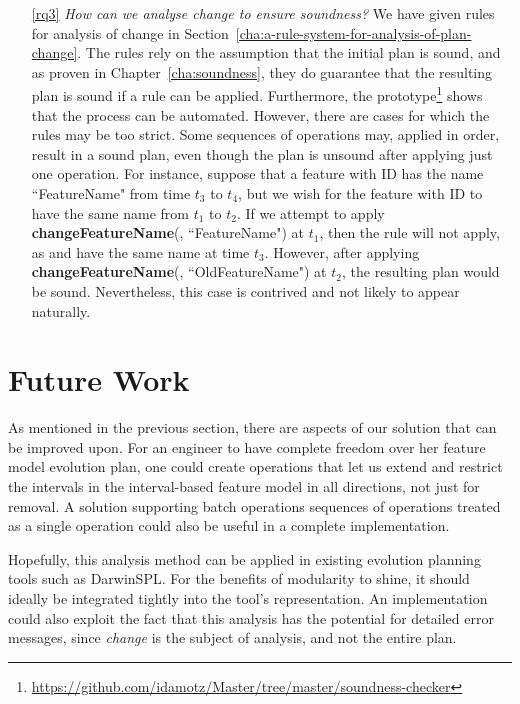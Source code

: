 \begin{enumerate}
   \item[\ref{rq3}] \textit{How can we analyse change to ensure soundness?} 
      We have given rules for analysis of change in Section~\vref{cha:a-rule-system-for-analysis-of-plan-change}. The rules rely on the assumption that the initial plan is sound, and as proven in Chapter~\vref{cha:soundness}, they do guarantee that the resulting plan is sound if a rule can be applied. Furthermore, the prototype\footnote{\url{https://github.com/idamotz/Master/tree/master/soundness-checker}} shows that the process can be automated. However, there are cases for which the rules may be too strict. Some sequences of operations may, applied in order, result in a sound plan, even though the plan is unsound after applying just one operation. For instance, suppose that a feature with ID  has the name ``FeatureName" from time $t_3$ to $t_4$, but we wish for the feature with ID  to have the same name from $t_1$ to $t_2$. If we attempt to apply \textbf{changeFeatureName}(, ``FeatureName") at $t_1$, then the  rule will not apply, as  and  have the same name at time $t_3$. However, after applying \textbf{changeFeatureName}(, ``OldFeatureName") at $t_2$, the resulting plan would be sound.
      Nevertheless, this case is contrived and not likely to appear naturally. 
      
\end{enumerate}

\section{Future Work}

As mentioned in the previous section, there are aspects of our solution that can be improved upon. For an engineer to have complete freedom over her feature model evolution plan, one could create operations that let us extend and restrict the intervals in the interval-based feature model in all directions, not just for removal. A solution supporting batch operations \textemdash{} sequences of operations treated as a single operation \textemdash{} could also be useful in a complete implementation. 

Hopefully, this analysis method can be applied in existing evolution planning tools such as DarwinSPL. For the benefits of modularity to shine, it should ideally be integrated tightly into the tool's representation. An implementation could also exploit the fact that this analysis has the potential for detailed error messages, since \emph{change} is the subject of analysis, and not the entire plan.

